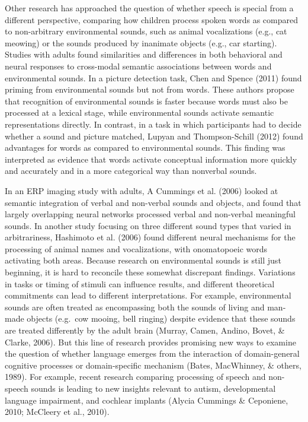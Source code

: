 \documentclass[english,floatsintext,man]{apa6}
\newcounter{author}
\theoremstyle{definition}
\theoremstyle{definition}
\theoremstyle{definition}
\theoremstyle{remark}
\begin{document}
Other research has approached the question of whether speech is special
from a different perspective, comparing how children process spoken
words as compared to non-arbitrary environmental sounds, such as animal
vocalizations (e.g., cat meowing) or the sounds produced by inanimate
objects (e.g., car starting). Studies with adults found similarities and
differences in both behavioral and neural responses to cross-modal
semantic associations between words and environmental sounds. In a
picture detection task, Chen and Spence (2011) found priming from
environmental sounds but not from words. These authors propose that
recognition of environmental sounds is faster because words must also be
processed at a lexical stage, while environmental sounds activate
semantic representations directly. In contrast, in a task in which
participants had to decide whether a sound and picture matched, Lupyan
and Thompson-Schill (2012) found advantages for words as compared to
environmental sounds. This finding was interpreted as evidence that
words activate conceptual information more quickly and accurately and in
a more categorical way than nonverbal sounds.

In an ERP imaging study with adults, A Cummings et al. (2006) looked at
semantic integration of verbal and non-verbal sounds and objects, and
found that largely overlapping neural networks processed verbal and
non-verbal meaningful sounds. In another study focusing on three
different sound types that varied in arbitrariness, Hashimoto et al.
(2006) found different neural mechanisms for the processing of animal
names and vocalizations, with onomatopoeic words activating both areas.
Because research on environmental sounds is still just beginning, it is
hard to reconcile these somewhat discrepant findings. Variations in
tasks or timing of stimuli can influence results, and different
theoretical commitments can lead to different interpretations. For
example, environmental sounds are often treated as encompassing both the
sounds of living and man-made objects (e.g.~cow mooing, bell ringing)
despite evidence that these sounds are treated differently by the adult
brain (Murray, Camen, Andino, Bovet, \& Clarke, 2006). But this line of
research provides promising new ways to examine the question of whether
language emerges from the interaction of domain-general cognitive
processes or domain-specific mechanism (Bates, MacWhinney, \& others,
1989). For example, recent research comparing processing of speech and
non-speech sounds is leading to new insights relevant to autism,
developmental language impairment, and cochlear implants (Alycia
Cummings \& Ceponiene, 2010; McCleery et al., 2010).
\end{document}
